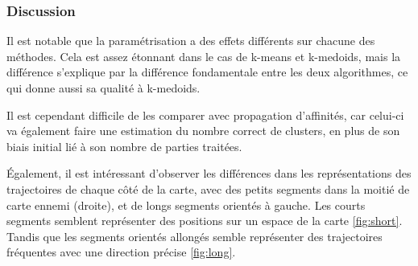 \subsubsection{Discussion}

Il est notable que la paramétrisation a des effets différents sur chacune des méthodes. Cela est assez étonnant dans le cas de k-means et k-medoids, mais la différence s'explique par la différence fondamentale entre les deux algorithmes, ce qui donne aussi sa qualité à k-medoids.

Il est cependant difficile de les comparer avec propagation d'affinités, car celui-ci va également faire une estimation du nombre correct de clusters, en plus de son biais initial lié à son nombre de parties traitées.

Également, il est intéressant d'observer les différences dans les représentations des trajectoires de chaque côté de la carte, avec des petits segments dans la moitié de carte ennemi (droite), et de longs segments orientés à gauche. Les courts segments semblent représenter des positions sur un espace de la carte \ref{fig:short}. Tandis que les segments orientés allongés semble représenter des trajectoires fréquentes avec une direction précise \ref{fig:long}. 

